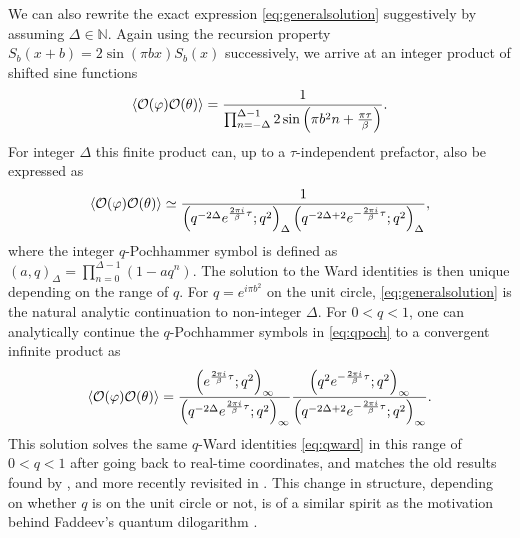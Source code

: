 \documentclass[a4paper,titlepage,12pt]{article}
\numberwithin{equation}{section}
\begin{document}
We can also rewrite the exact expression \eqref{eq:generalsolution} suggestively by assuming $\Delta\in \mathbb{N}$. Again using the recursion property $S_b(x+b)=2\sin(\pi bx)S_b(x) $ successively, we arrive at an integer product of shifted sine functions
\begin{align}
\label{2.46}
    \braket{\mathcal{O}(\varphi)\mathcal{O}(\theta)}=\frac{1}{\prod_{n=-\Delta}^{\Delta-1}2\sin\left(\pi b^2n+\frac{\pi\tau}{\beta }\right)}.
\end{align} 
For integer $\Delta$ this finite product can, up to a $\tau$-independent prefactor, also be expressed as 
\begin{align}
\label{eq:qpoch}
    \braket{\mathcal{O}(\varphi)\mathcal{O}(\theta)}\simeq \frac{1}{\left(q^{-2\Delta}e^{\frac{2\pi i}{\beta}\tau};q^2\right)_\Delta\left(q^{-2\Delta+2}e^{-\frac{2\pi i}{\beta}\tau};q^2\right)_\Delta},
\end{align}
where the integer $q$-Pochhammer symbol is defined as $(a,q)_\Delta=\prod_{n=0}^{\Delta-1}(1-aq^n)$. The solution to the Ward identities is then unique depending on the range of $q$. For $q=e^{i\pi b^2}$ on the unit circle, \eqref{eq:generalsolution} is the natural analytic continuation to non-integer $\Delta$. For $0<q<1$, one can analytically continue the $q$-Pochhammer symbols in \eqref{eq:qpoch} to a convergent infinite product as 
\begin{align}\label{eq:analyplch}
     \braket{\mathcal{O}(\varphi)\mathcal{O}(\theta)}=\frac{\left(e^{\frac{2\pi i}{\beta}\tau};q^2\right)_\infty}{\left(q^{-2\Delta}e^{\frac{2\pi i}{\beta}\tau};q^2\right)_\infty}\frac{\left(q^2e^{-\frac{2\pi i}{\beta}\tau};q^2\right)_\infty}{\left(q^{-2\Delta+2}e^{-\frac{2\pi i}{\beta}\tau};q^2\right)_\infty}.
\end{align} 
This solution solves the same $q$-Ward identities \eqref{eq:qward} in this range of $0<q<1$ after going back to real-time coordinates, and matches the old results found by \cite{Bernard:1989jq,Matsuzaki:1991vu}, and more recently revisited in \cite{Almheiri:2024ayc}. This change in structure, depending on whether $q$ is on the unit circle or not, is of a similar spirit as the motivation behind Faddeev's quantum dilogarithm \cite{Faddeev:1999fe}.
\end{document}
